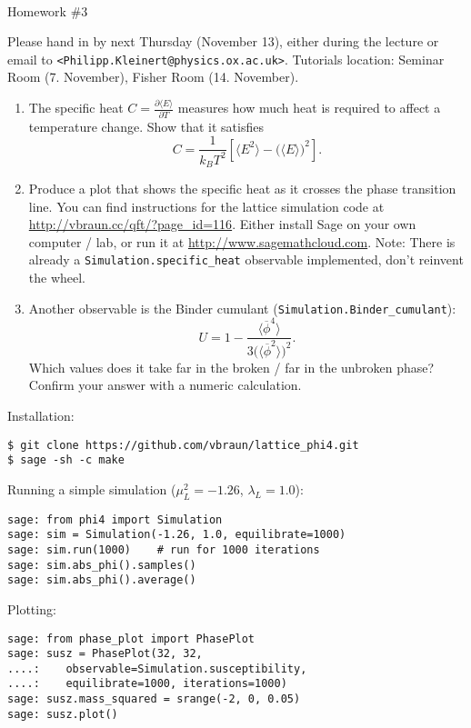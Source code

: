 \documentclass[12pt]{article}
\begin{document}
~
\vspace{-2cm}
\begin{center}
  {\Huge Homework \#3}
\end{center}
\vspace{1cm}

\noindent Please hand in by next Thursday (November 13), either during
the lecture or email to \texttt{<Philipp.Kleinert@physics.ox.ac.uk>}.
Tutorials location: Seminar Room (7. November), Fisher Room
(14. November).



\begin{enumerate}
\item The specific heat $C=\tfrac{\partial\langle E\rangle}{\partial
    T}$ measures how much heat is required to affect a temperature
  change. Show that it satisfies 
  \begin{equation}
    C = \frac{1}{k_B T^2} \left[
      \langle E^2 \rangle - 
      \big( \langle E \rangle \big)^2
    \right].
  \end{equation}
\item Produce a plot that shows the specific heat as it crosses the
  phase transition line. You can find instructions for the lattice
  simulation code at \url{http://vbraun.cc/qft/?page_id=116}. Either
  install Sage on your own computer / lab, or run it at
  \url{http://www.sagemathcloud.com}. Note: There is already a
  \texttt{Simulation.specific\_heat} observable implemented, don't
  reinvent the wheel.

\item Another observable is the Binder cumulant
  (\texttt{Simulation.Binder\_cumulant}):
  \begin{equation}
    U = 1 - \frac{\langle \overline\phi^4 \rangle}
    {3 \big(\langle\overline\phi^2\rangle\big)^2}.
  \end{equation}
  Which values does it take far in the broken / far in the unbroken
  phase? Confirm your answer with a numeric calculation.
\end{enumerate}
Installation:
\begin{verbatim}
$ git clone https://github.com/vbraun/lattice_phi4.git
$ sage -sh -c make
\end{verbatim}
Running a simple simulation ($\mu_L^2=-1.26$, $\lambda_L=1.0$):
\begin{verbatim}
sage: from phi4 import Simulation
sage: sim = Simulation(-1.26, 1.0, equilibrate=1000)
sage: sim.run(1000)    # run for 1000 iterations
sage: sim.abs_phi().samples()
sage: sim.abs_phi().average()
\end{verbatim}
Plotting:
\begin{verbatim}
sage: from phase_plot import PhasePlot
sage: susz = PhasePlot(32, 32, 
....:    observable=Simulation.susceptibility, 
....:    equilibrate=1000, iterations=1000)
sage: susz.mass_squared = srange(-2, 0, 0.05)
sage: susz.plot()
\end{verbatim}
\end{document}
